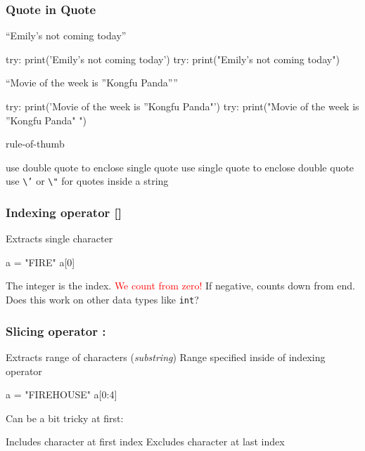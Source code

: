 \documentclass[11pt]{beamer}
\begin{document}
\begin{frame}
  \frametitle{Quote in Quote}
  \Enlarge

  \begin{itemize}
  \myitem  ``Emily's not coming today''
  	\begin{itemize}
	\mysubitem try: {\small print('Emily's not coming today')}
	\mysubitem try: {\small print("Emily's not coming today")}
	\end{itemize}\pause
  \myitem ``Movie of the week is ''Kongfu Panda''''
  	\begin{itemize}
	\mysubitem try: {\small print('Movie of the week is ''Kongfu Panda"')}
	\mysubitem try: {\small print("Movie of the week is ''Kongfu Panda" ")}
	\end{itemize} \pause
  \myitem rule-of-thumb 
  	\begin{itemize}
	\mysubitem use double quote to enclose single quote
	\mysubitem use single quote to enclose double quote
	\mysubitem use \texttt{\textbackslash '} or \texttt{\textbackslash "} for quotes inside a string 
	\end{itemize}
 \end{itemize}
\end{frame}


\begin{frame}[fragile]
  \frametitle{Indexing operator \textbf{[]}}
  \Enlarge

  \begin{itemize}
  \myitem  Extracts single character
\begin{semiverbatim}
a = "FIRE"
a[0]
\end{semiverbatim}
  \myitem  The integer is the index. \pause
  \myitem  \textcolor{red}{We count from zero!} \pause
  \myitem  If negative, counts down from end. \pause
  \myitem  Does this work on other data types like \texttt{int}?
  \end{itemize}
\end{frame}

\begin{frame}[fragile]
  \frametitle{Slicing operator \textbf{:}}
  \Enlarge

  \begin{itemize}
  \myitem  Extracts range of characters (\emph{substring}) \pause
  \myitem  Range specified inside of indexing operator \pause
\begin{semiverbatim}
a = "FIREHOUSE"
a[0:4]
\end{semiverbatim} \pause
  \myitem  Can be a bit tricky at first:
    \begin{itemize}
    \mysubitem  Includes character at first index
    \mysubitem  Excludes character at last index
    \end{itemize}
  \end{itemize}
\end{frame}
\end{document}
